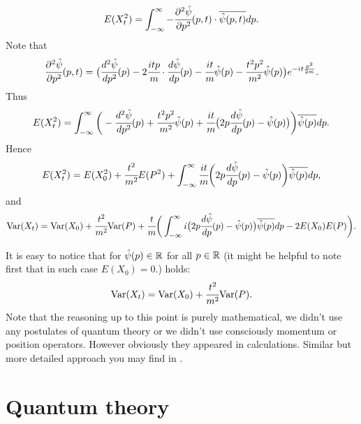 \documentclass[main.tex]{subfiles}
\begin{document}
\begin{equation}
    E(X^2_t) = \int_{-\infty}^{\infty} - \cfrac{\partial^2 \hat{\psi}}{\partial p^2}(p, t) \cdot \overline{\hat{\psi}(p, t)} dp.
\end{equation}
Note that
\begin{equation}
    \cfrac{\partial^2 \hat{\psi}}{\partial p^2}(p, t) = 
    \big(\cfrac{d^2 \hat{\psi}}{d p^2}(p) - 2\cfrac{itp}{m}\cdot\cfrac{d \hat{\psi}}{d p}(p) - \cfrac{it}{m}\hat{\psi}(p) - \cfrac{t^2p^2}{m^2}\hat{\psi}(p)\big)e^{-it\frac{p^2}{2m}}.
\end{equation}
Thus
\begin{equation}
    E(X^2_t) = \int_{-\infty}^{\infty}\bigg(-\cfrac{d^2 \hat{\psi}}{d p^2}(p) + \cfrac{t^2p^2}{m^2}\hat{\psi}(p) + \cfrac{it}{m}\big(2p\cfrac{d \hat{\psi}}{d p}(p) - \hat{\psi}(p)\big)\bigg)\overline{\hat{\psi}(p)} dp.
\end{equation}
Hence
\begin{equation}
    E(X^2_t) = E(X^2_0) + \cfrac{t^2}{m^2}E(P^2) + \int_{-\infty}^{\infty}\cfrac{it}{m}\bigg(2p\cfrac{d \hat{\psi}}{d p}(p) - \hat{\psi}(p)\bigg)\overline{\hat{\psi}(p)} dp,
\end{equation}
and
\begin{equation}
    \text{Var}(X_t) = \text{Var}(X_0) + \cfrac{t^2}{m^2}\text{Var}(P) + 
    \cfrac{t}{m}\bigg(\int_{-\infty}^{\infty}i\big(2p\cfrac{d \hat{\psi}}{d p}(p) - \hat{\psi}(p)\big)\overline{\hat{\psi}(p)} dp - 2E(X_0)E(P)\bigg).
\end{equation}


It is easy to notice that for $\hat{\psi}(p)\in\mathbb{R}$ for all $p\in\mathbb{R}$ (it might be helpful to note first that in such case $E(X_0) = 0$.) holds:
\begin{equation}
    \text{Var}(X_t) = \text{Var}(X_0) + \cfrac{t^2}{m^2}\text{Var}(P).
\end{equation}
Note that the reasoning up to this point is purely mathematical, we didn't use any postulates of quantum theory or we didn't use consciously momentum or position operators. However obviously they appeared in calculations. 
Similar but more detailed approach you may find in \cite{hall2013}.
\section{Quantum theory}
\end{document}
